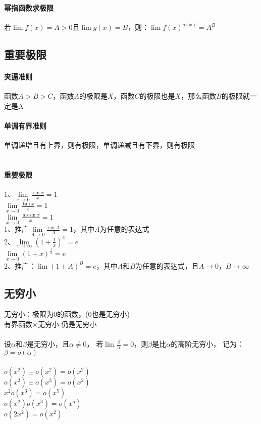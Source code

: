 \documentclass{article}
\begin{document}
\begin{flushleft}
	\paragraph{幂指函数求极限}
	若$\lim f(x)=A>0$且$\lim g(x)=B$，则：$\lim f(x)^{g(x)}=A^B$\\
	
	\subsection{重要极限}
	
	\paragraph{夹逼准则}
	函数$A>B>C$，函数$A$的极限是$X$，函数$C$的极限也是$X$，那么函数$B$的极限就一定是$X$\\
	\paragraph{单调有界准则}
	单调递增且有上界，则有极限，单调递减且有下界，则有极限\\
	~\\
	\paragraph{重要极限}
	1、$\lim\limits_{x\to 0} \frac{\sin x}{x}=1$\\
	\qquad $\lim\limits_{x\to 0} \frac{\tan x}{x}=1$\\
	\qquad $\lim\limits_{x\to 0} \frac{\arcsin x}{x}=1$\\
	1、推广$\lim\limits_{A\to 0} \frac{\sin A}{A}=1$，其中$A$为任意的表达式\\
	2、$\lim\limits_{x\to \infty} (1+\frac{1}{x})^x=e$\\
	\qquad $\lim\limits_{x\to 0} (1+x)^{\frac{1}{x}}=e$\\
	2、推广：$\lim (1+A)^{B}=e$，其中$A$和$B$为任意的表达式，且$A\to 0$，$B\to\infty$\\
	
	\subsection{无穷小}
	
	无穷小：极限为0的函数，(0也是无穷小)\\
	有界函数$\times$无穷小 仍是无穷小\\
	~\\
	设$\alpha$和$\beta$是无穷小，且$\alpha \neq 0$，
	若$\lim \frac{\beta}{\alpha}=0$，则$\beta$是比$\alpha$的高阶无穷小，
	记为：$\beta = o(\alpha)$\\
	~\\
	$o(x^2)\pm o(x^2)=o(x^2)$\\
	$o(x^2)\pm o(x^3)=o(x^2)$\\
	$x^2 o(x^3)=o(x^5)$\\
	$o(x^2) o(x^3)=o(x^5)$\\
	$o(2x^2)=o(x^2)$\\
	

\end{flushleft}
\end{document}
